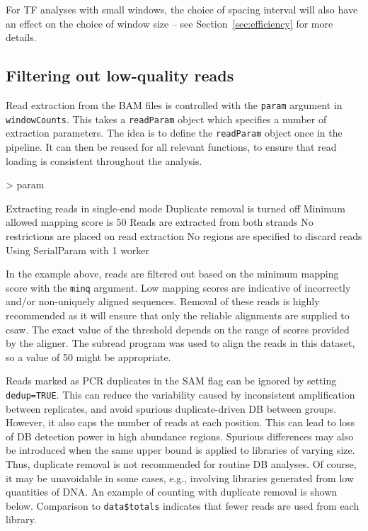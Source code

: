 \documentclass[12pt]{report}
\renewenvironment{Schunk}{\vspace{0pt}}{\vspace{0pt}}
\newcommand{\pkgname}{csaw}
\newcommand{\code}[1]{{\small\texttt{#1}}}
\newcommand{\subread}{subread}
\begin{document}
For TF analyses with small windows, the choice of spacing interval will also have an effect on the choice of window size -- see Section~\ref{sec:efficiency} for more details.

\subsection{Filtering out low-quality reads}
Read extraction from the BAM files is controlled with the \code{param} argument in \code{windowCounts}.
This takes a \code{readParam} object which specifies a number of extraction parameters.
The idea is to define the \code{readParam} object once in the pipeline.
It can then be reused for all relevant functions, to ensure that read loading is consistent throughout the analysis.

\begin{Schunk}
\begin{Sinput}
> param
\end{Sinput}
\begin{Soutput}
    Extracting reads in single-end mode
    Duplicate removal is turned off 
    Minimum allowed mapping score is 50 
    Reads are extracted from both strands
    No restrictions are placed on read extraction
    No regions are specified to discard reads
    Using SerialParam with 1 worker
\end{Soutput}
\end{Schunk}

In the example above, reads are filtered out based on the minimum mapping score with the \code{minq} argument. 
Low mapping scores are indicative of incorrectly and/or non-uniquely aligned sequences. 
Removal of these reads is highly recommended as it will ensure that only the reliable alignments are supplied to \pkgname{}.
The exact value of the threshold depends on the range of scores provided by the aligner. 
The \subread{} program \citep{liao2013} was used to align the reads in this dataset, so a value of 50 might be appropriate.

Reads marked as PCR duplicates in the SAM flag can be ignored by setting \code{dedup=TRUE}. 
This can reduce the variability caused by inconsistent amplification between replicates, and avoid spurious duplicate-driven DB between groups. 
However, it also caps the number of reads at each position. 
This can lead to loss of DB detection power in high abundance regions. 
Spurious differences may also be introduced when the same upper bound is applied to libraries of varying size. 
Thus, duplicate removal is not recommended for routine DB analyses. 
Of course, it may be unavoidable in some cases, e.g., involving libraries generated from low quantities of DNA.
An example of counting with duplicate removal is shown below.
Comparison to \code{data\$totals} indicates that fewer reads are used from each library.
\end{document}

